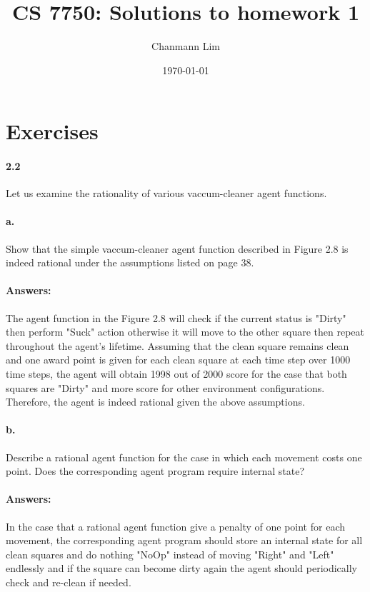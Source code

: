 \documentclass[a4paper]{article}
\begin{document}
\title{CS 7750: Solutions to homework 1}
\author{Chanmann Lim}
\date{\today}
\maketitle

\section*{Exercises}

\paragraph{2.2}
Let us examine the rationality of various vaccum-cleaner agent functions.

\paragraph{a.}
Show that the simple vaccum-cleaner agent function described in Figure 2.8 is indeed rational under the assumptions listed on page 38.

\paragraph{Answers:}
The agent function in the Figure 2.8 will check if the current status is "Dirty" 
then perform "Suck" action otherwise it will move to the other square then repeat throughout the agent's 
lifetime. Assuming that the clean square remains clean and one award point is given for each clean square 
at each time step over 1000 time steps, the agent will obtain 1998 out of 2000 score for the case that 
both squares are "Dirty" and more score for other environment configurations. Therefore, the agent is indeed rational given the above assumptions.

\paragraph{b.}
Describe a rational agent function for the case in which each movement costs one point. Does the corresponding agent program require internal state?

\paragraph{Answers:}
In the case that a rational agent function give a penalty of one point for each 
movement, the corresponding agent program should store an internal state for all clean squares and do 
nothing "NoOp" instead of moving "Right" and "Left" endlessly and if the square can become dirty again 
the agent should periodically check and re-clean if needed.
\end{document}
